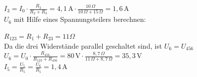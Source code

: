 {        $I_3 = I_0 \cdot \frac{R_2}{R_2 + R_3} = 4,1 \, \mathrm{A} \cdot \frac{10 \, \Omega}{10 \, \Omega + 15 \, \Omega} = 1,6 \, \mathrm{A}$\\

        $U_6$ mit Hilfe eines Spannungsteilers berechnen:

       \begin{center}
             
       \end{center}

       $R_{123} = R_1 + R_{23} = 11 \Omega$\\

       Da die drei Widerstände parallel geschaltet sind, ist $U_6 = U_{456}$\\

       $U_6 = U_0 \cdot \frac{R_{456}}{R_{123} + R_{456}} = 80 \, \mathrm{V} \cdot \frac{8,7 \, \Omega}{11 \, \Omega + 8,7 \, \Omega} = 35,3 \, \mathrm{V}$\\

       $I_5 = \frac{U_5}{R_5} = \frac{U_6}{R_5} = 1,4 \, \mathrm{A}$
       
       





	
}        